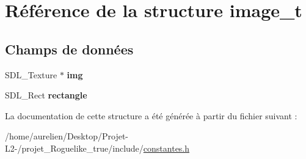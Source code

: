 \hypertarget{structimage__t}{}\section{Référence de la structure image\+\_\+t}
\label{structimage__t}
\subsection*{Champs de données}
\begin{DoxyCompactItemize}
\item 
\mbox{\label{structimage__t_aa61e957150bc0bf8b0147ec8caa1ecb0}} 
S\+D\+L\+\_\+\+Texture $\ast$ {\bfseries img}
\item 
\mbox{\label{structimage__t_abcb7f48a4050ae247aecbc34598b3cd8}} 
S\+D\+L\+\_\+\+Rect {\bfseries rectangle}
\end{DoxyCompactItemize}


La documentation de cette structure a été générée à partir du fichier suivant \+:\begin{DoxyCompactItemize}
\item 
/home/aurelien/\+Desktop/\+Projet-\/\+L2-\//projet\+\_\+\+Roguelike\+\_\+true/include/\hyperlink{constantes_8h}{constantes.\+h}\end{DoxyCompactItemize}
